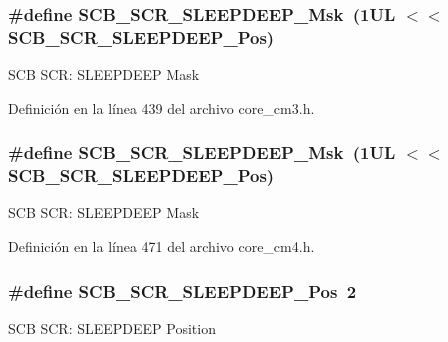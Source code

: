 \subsubsection[{\texorpdfstring{S\+C\+B\+\_\+\+S\+C\+R\+\_\+\+S\+L\+E\+E\+P\+D\+E\+E\+P\+\_\+\+Msk}{SCB_SCR_SLEEPDEEP_Msk}}]{\setlength{\rightskip}{0pt plus 5cm}\#define S\+C\+B\+\_\+\+S\+C\+R\+\_\+\+S\+L\+E\+E\+P\+D\+E\+E\+P\+\_\+\+Msk~(1\+U\+L $<$$<$ S\+C\+B\+\_\+\+S\+C\+R\+\_\+\+S\+L\+E\+E\+P\+D\+E\+E\+P\+\_\+\+Pos)}\hypertarget{group___c_m_s_i_s___s_c_b_ga77c06a69c63f4b3f6ec1032e911e18e7}{}\label{group___c_m_s_i_s___s_c_b_ga77c06a69c63f4b3f6ec1032e911e18e7}
S\+CB S\+CR\+: S\+L\+E\+E\+P\+D\+E\+EP Mask 

Definición en la línea 439 del archivo core\+\_\+cm3.\+h.

\subsubsection[{\texorpdfstring{S\+C\+B\+\_\+\+S\+C\+R\+\_\+\+S\+L\+E\+E\+P\+D\+E\+E\+P\+\_\+\+Msk}{SCB_SCR_SLEEPDEEP_Msk}}]{\setlength{\rightskip}{0pt plus 5cm}\#define S\+C\+B\+\_\+\+S\+C\+R\+\_\+\+S\+L\+E\+E\+P\+D\+E\+E\+P\+\_\+\+Msk~(1\+U\+L $<$$<$ S\+C\+B\+\_\+\+S\+C\+R\+\_\+\+S\+L\+E\+E\+P\+D\+E\+E\+P\+\_\+\+Pos)}\hypertarget{group___c_m_s_i_s___s_c_b_ga77c06a69c63f4b3f6ec1032e911e18e7}{}\label{group___c_m_s_i_s___s_c_b_ga77c06a69c63f4b3f6ec1032e911e18e7}
S\+CB S\+CR\+: S\+L\+E\+E\+P\+D\+E\+EP Mask 

Definición en la línea 471 del archivo core\+\_\+cm4.\+h.

\subsubsection[{\texorpdfstring{S\+C\+B\+\_\+\+S\+C\+R\+\_\+\+S\+L\+E\+E\+P\+D\+E\+E\+P\+\_\+\+Pos}{SCB_SCR_SLEEPDEEP_Pos}}]{\setlength{\rightskip}{0pt plus 5cm}\#define S\+C\+B\+\_\+\+S\+C\+R\+\_\+\+S\+L\+E\+E\+P\+D\+E\+E\+P\+\_\+\+Pos~2}\hypertarget{group___c_m_s_i_s___s_c_b_gab304f6258ec03bd9a6e7a360515c3cfe}{}\label{group___c_m_s_i_s___s_c_b_gab304f6258ec03bd9a6e7a360515c3cfe}
S\+CB S\+CR\+: S\+L\+E\+E\+P\+D\+E\+EP Position 

